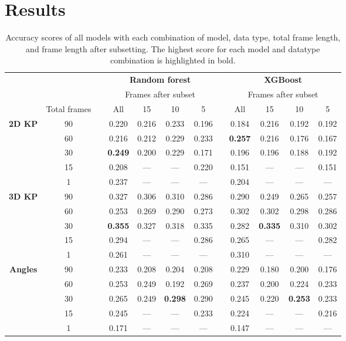 \documentclass[11pt, letterpaper]{article} %
\begin{document}
\section{Results}


\begin{table}[htbp]
    \centering
    \caption{Accuracy scores of all models with each combination of model, data type, total frame length, and frame length after subsetting. The highest score for each model and datatype combination is highlighted in bold.}
    \begin{tabular}{cccccccccccc}

    \toprule
    \multicolumn{3}{c}{} & \multicolumn{4}{c}{\textbf{Random forest}} & \multicolumn{1}{c}{} & \multicolumn{4}{c}{\textbf{XGBoost}}\\ 
    \multicolumn{3}{c}{} & \multicolumn{4}{c}{Frames after subset} & \multicolumn{1}{c}{} & \multicolumn{4}{c}{Frames after subset}\\ 
    \cmidrule(rl){4-7} \cmidrule(rl){9-12}
    &Total frames && All     & 15     & 10     & 5     & & All     & 15     & 10     & 5 \\ 
    \cmidrule(rl){2-2} \cmidrule(){4-7} \cmidrule(){9-12}
    \multirow{5}{*}{\textbf{2D KP}} &90 &&0.220 &0.216 &0.233 &0.196 &&0.184 &0.216 &0.192 &0.192 \\
&60 &&0.216 &0.212 &0.229 &0.233 &&\textbf{0.257} &0.216 &0.176 &0.167 \\
&30 &&\textbf{0.249} &0.200 &0.229 &0.171 &&0.196 &0.196 &0.188 &0.192 \\
&15 &&0.208 &--- &--- &0.220 &&0.151 &--- &--- &0.151 \\
&1 &&0.237 &--- &--- &--- &&0.204 &--- &--- &--- \\
    \cmidrule(rl){2-2} \cmidrule(){4-7} \cmidrule(){9-12}
    \multirow{5}{*}{\textbf{3D KP}} &90 &&0.327 &0.306 &0.310 &0.286 &&0.290 &0.249 &0.265 &0.257 \\
&60 &&0.253 &0.269 &0.290 &0.273 &&0.302 &0.302 &0.298 &0.286 \\
&30 &&\textbf{0.355} &0.327 &0.318 &0.335 &&0.282 &\textbf{0.335} &0.310 &0.302 \\
&15 &&0.294 &--- &--- &0.286 &&0.265 &--- &--- &0.282 \\
&1 &&0.261 &--- &--- &--- &&0.310 &--- &--- &--- \\
    \cmidrule(rl){2-2} \cmidrule(){4-7} \cmidrule(){9-12}
    \multirow{5}{*}{\textbf{Angles}} &90 &&0.233 &0.208 &0.204 &0.208 &&0.229 &0.180 &0.200 &0.176 \\
&60 &&0.253 &0.249 &0.192 &0.269 &&0.237 &0.200 &0.224 &0.233 \\
&30 &&0.265 &0.249 &\textbf{0.298} &0.290 &&0.245 &0.220 &\textbf{0.253} &0.233 \\
&15 &&0.245 &--- &--- &0.233 &&0.224 &--- &--- &0.216 \\
&1 &&0.171 &--- &--- &--- &&0.147 &--- &--- &--- \\
    \bottomrule


\end{tabular}
\end{table}
\end{document}
